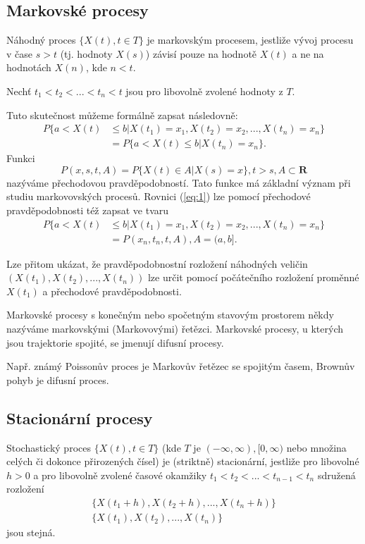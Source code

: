 \documentclass[10pt]{article}
\begin{document}
\subsection{Markovské procesy}
\label{sec:1.3}
Náhodný proces $\{X(t),t \in T\}$ je markovským procesem, jestliže vývoj procesu v čase $s>t$ (tj. hodnoty $X(s)$) závisí pouze na hodnotě $X(t)$ a ne na hodnotách $X(n)$, kde $n<t$.

Nechť $t_1<t_2<...<t_n<t$ jsou pro libovolně zvolené hodnoty z $T$.

Tuto skutečnost můžeme formálně zapsat následovně:
\begin{equation}
\label{eq:1}
\begin{split}
P\{a<X(t) 	& \leq b | X(t_1)=x_1,X(t_2)=x_2,...,X(t_n)=x_n\}\\
		&=P\{a<X(t)\leq b |X(t_n)=x_n\}.
\end{split}
\end{equation}
Funkci
\begin{equation}
P(x,s,t,A) = P\{X(t)\in A |X(s)=x\},t>s,A \subset \mathbf{R}
\end{equation}
nazýváme přechodovou pravděpodobností. Tato funkce má základní význam při studiu markovovských procesů. Rovnici (\ref{eq:1}) lze pomocí přechodové pravděpodobnosti též zapsat ve tvaru 
\begin{equation}
\label{eq:2}
\begin{split}
P\{a<X(t) 	& \leq b | X(t_1)=x_1,X(t_2)=x_2,...,X(t_n)=x_n\}\\
		&=P(x_n,t_n,t,A), A=(a,b].
\end{split}
\end{equation}

Lze přitom ukázat, že pravděpodobnostní rozložení náhodných veličin $(X(t_1), X(t_2), ..., X(t_n))$ lze určit pomocí počátečního rozložení proměnné $X(t_1)$ a přechodové pravděpodobnosti.

Markovské procesy s konečným nebo spočetným stavovým prostorem někdy nazýváme markovskými (Markovovými) řetězci. Markovské procesy, u kterých jsou trajektorie spojité, se jmenují difusní procesy.

Např. známý Poissonův proces je Markovův řetězec se spojitým časem, Brownův pohyb je difusní proces.

\subsection{Stacionární procesy}
Stochastický proces $\{X(t),t \in T\}$ (kde $T$ je $(-\infty, \infty),[0,\infty)$ nebo množina celých či dokonce přirozených čísel) je (striktně) stacionární, jestliže pro libovolné $h>0$ a pro libovolně zvolené časové okamžiky $t_1<t_2<...<t_{n-1}<t_{n}$ sdružená rozložení 
\begin{gather}
\{X(t_1+h),X(t_2+h),...,X(t_n+h)\}\\
\{X(t_1),X(t_2),...,X(t_n)\}
\end{gather} jsou stejná.
\end{document}

